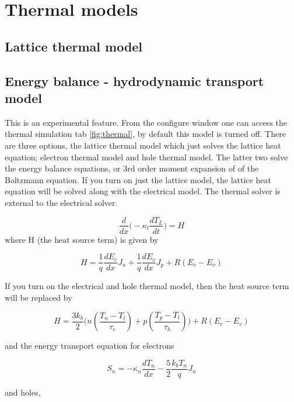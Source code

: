\documentclass[11pt]{article}
\begin{document}
\vfill
\clearpage


\newpage

\section{Thermal models}
\subsection{Lattice thermal model}

\subsection{Energy balance - hydrodynamic transport model}
This is an experimental feature.  From the configure window one can access the thermal simulation tab \ref{fig:thermal}, by default this model is turned off.  There are three options, the lattice thermal model which just solves the lattice heat equation; electron thermal model and hole thermal model.  The latter two solve the energy balance equations, or 3rd order moment expansion of of the Boltzmann equation.  If you turn on just the lattice model, the lattice heat equation will be solved along with the electrical model.  The thermal solver is external to the electrical solver. 

\begin{equation}
 \frac{d}{dx}\Bigg(-  \kappa_{l} \frac{dT_{L}}{dt}\Bigg)=H
\end{equation}
where H (the heat source term) is given by

\begin{equation}
H=\frac{1}{q}\frac{dE_{c}}{dx} J_{n}+\frac{1}{q}\frac{dE_{v}}{dx} J_{p}+R(E_{c}-E_{v})
\end{equation}

If you turn on the electrical and hole thermal model, then the heat source term will be replaced by

\begin{equation}
H=\frac{3 k_{b}}{2} \Bigg ( n (\frac{T_{n}-T_{l}}{\tau_{e}}) + p (\frac{T_{p}-T_{l}}{\tau_{h}})\Bigg) +R(E_{c}-E_{v})
\end{equation}

and the energy transport equation for electrons

\begin{equation}
S_n=-\kappa_n \frac{dT_{n}}{dx}-\frac{5}{2} \frac{k_{b}T_{n}}{q} J_{n}
\end{equation}

and holes,
\end{document}

